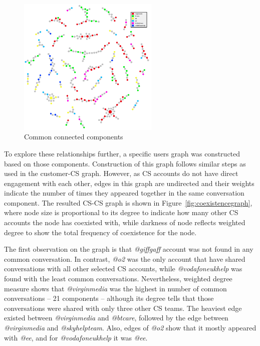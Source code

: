 \documentclass[sigconf]{acmart}
\begin{document}
{\begin{figure}[htb]
\centering
\includegraphics[width=0.6\textwidth]{images/commoncc.png}
\caption{Common connected components}
\label{fig:commoncc}
\end{figure}

To explore these relationships further, a specific users graph was
constructed based on those components. Construction of this graph
follows similar steps as used in the customer-CS graph. However, as CS
accounts do not have direct engagement with each other, edges in this
graph are undirected and their weights indicate the number of times
they appeared together in the same conversation component.  The
resulted CS-CS graph is shown in Figure~\ref{fig:coexistencegraph},
where node size is proportional to its degree to indicate how many
other CS accounts the node has coexisted with, while darkness of node
reflects weighted degree to show the total frequency of coexistence
for the node.

The first observation on the graph is that {\emph{@giffgaff}} account
was not found in any common conversation. In contrast, {\emph{@o2}}
was the only account that have shared conversations with all other
selected CS accounts, while {\emph{@vodafoneukhelp}} was found with
the least common conversations. Nevertheless, weighted degree measure
shows that {\emph{@virginmedia}} was the highest in number of common
conversations -- 21 components -- although its degree tells that those
conversations were shared with only three other CS teams. The heaviest
edge existed between {\emph{@virginmedia}} and {\emph{@btcare}},
followed by the edge between {\emph{@virginmedia}} and
{\emph{@skyhelpteam}}. Also, edges of {\emph{@o2}} show that it mostly
appeared with {\emph{@ee}}, and for {\emph{@vodafoneukhelp}} it was
{\emph{@ee}}.

}
\end{document}
